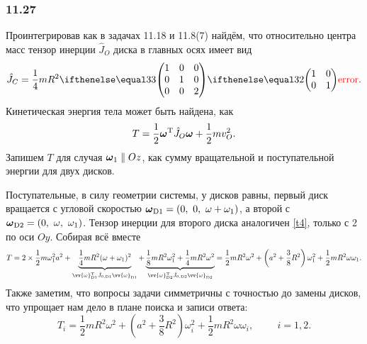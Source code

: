 \subsubsection*{11.27}

Проинтегрировав как в задачах 11.18 и 11.8(7) найдём, что относительно центра масс тензор инерции $\hat{J}_O$ диска в главных осях имеет вид
\begin{equation}
\label{t4}
    \hat{J}_C = \frac{1}{4} mR^2 \dmat{3}{1}{1}{2}.
\end{equation}
Кинетическая энергия тела может быть найдена, как
\begin{equation*}
    T = \frac{1}{2} \mbox{\boldmath $\omega$}^{\text{T}} \hat{J}_O \mbox{\boldmath $\omega$} + \frac{1}{2} m v_O^2.
\end{equation*}
Запишем $T$ для случая $\mbox{\boldmath $\omega$}_1 \parallel Oz$, как сумму вращательной и поступательной энергии для двух дисков. 

Поступательные, в силу геометрии системы, у дисков равны, первый диск вращается с угловой скоростью $\vc{\omega}_{\text{D1}}=(0,\ 0,\ \omega+\omega_1)$, а второй с $\vc{\omega}_{\text{D2}}=(0,\ \omega,\ \omega_1)$. Тензор инерции для второго диска аналогичен \eqref{t4}, только с 2 по оси $Oy$. Собирая всё вместе
\begin{equation*}
    T = 2 \times \frac{1}{2} m \omega_1^2 a^2 + 
    \underbrace{
        \frac{1}{4} mR^2 (\omega + \omega_1)^2
    }_{
    \vv{\omega}_{\text{D1}}\T \hat{J}_{0, \text{D1}} \vv{\omega}_{\text{D1}}
    }
     + 
     \underbrace{
     \frac{1}{8} mR^2 \omega_1^2 + \frac{1}{4} mR^2 \omega^2
     }_{
    \vv{\omega}_{\text{D2}}\T \hat{J}_{0, \text{D2}} \vv{\omega}_{\text{D2}}
     } =
     \frac{1}{2} m R^2 \omega^2 + \left(a^2 + \frac{3}{8} R^2\right) \omega_1^2 + \frac{1}{2} m R^2 \omega \omega_1.
\end{equation*}
Также заметим, что вопросы задачи симметричны с точностью до замены дисков, что упрощает нам дело в плане поиска и записи ответа:
\begin{equation}
    T_i = \frac{1}{2} m R^2 \omega^2 + \left(a^2 + \frac{3}{8} R^2\right) \omega_i^2 + \frac{1}{2} m R^2 \omega \omega_i,
    \hspace{1cm} i = 1, 2.
\end{equation}

